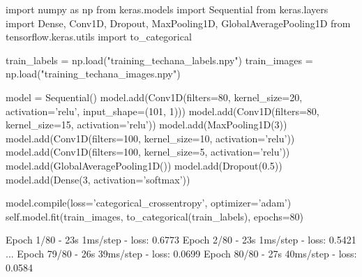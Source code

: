 \begin{ipython}
import numpy as np
from keras.models import Sequential
from keras.layers import Dense, Conv1D, Dropout, MaxPooling1D, GlobalAveragePooling1D
from tensorflow.keras.utils import to_categorical

train_labels = np.load("training_techana_labels.npy")
train_images = np.load("training_techana_images.npy")

model = Sequential()
model.add(Conv1D(filters=80, kernel_size=20, 
activation='relu', input_shape=(101, 1)))
model.add(Conv1D(filters=80, kernel_size=15, activation='relu')) 
model.add(MaxPooling1D(3))
model.add(Conv1D(filters=100, kernel_size=10, activation='relu'))
model.add(Conv1D(filters=100, kernel_size=5, activation='relu'))
model.add(GlobalAveragePooling1D())
model.add(Dropout(0.5))
model.add(Dense(3, activation='softmax'))

model.compile(loss='categorical_crossentropy', optimizer='adam')
self.model.fit(train_images, to_categorical(train_labels), epochs=80)
\end{ipython}
\begin{ioutput}
Epoch 1/80
- 23s 1ms/step - loss: 0.6773
Epoch 2/80
- 23s 1ms/step - loss: 0.5421
...
Epoch 79/80
- 26s 39ms/step - loss: 0.0699
Epoch 80/80
- 27s 40ms/step - loss: 0.0584
\end{ioutput}

